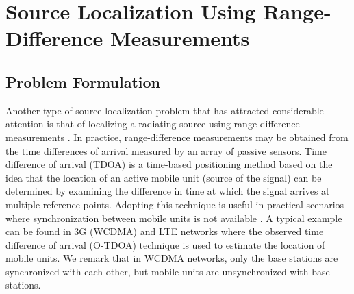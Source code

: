 
\newpage

\section{Source Localization Using Range-Difference Measurements}%
\subsection{Problem Formulation} %

Another type of source localization problem that has attracted considerable attention is that of localizing a radiating source using range-difference measurements \cite{ StLi, BeckStLi}. In practice, range-difference measurements may be obtained from the time differences of arrival measured by an array of passive sensors. Time difference of arrival (TDOA) is a time-based positioning method based on the idea that the location of an active mobile unit (source of the signal)  can be determined by examining the difference in time at which the signal arrives at multiple reference points. 
Adopting this technique is useful in practical scenarios where synchronization between mobile units is not available \cite{GeoLoc}. A typical example can be found in 3G (WCDMA) and LTE networks where the observed time difference of arrival (O-TDOA) technique is used %
to estimate the location of mobile units. We remark that in WCDMA networks, only the base stations are synchronized with each other, but mobile units are unsynchronized with base stations. 

